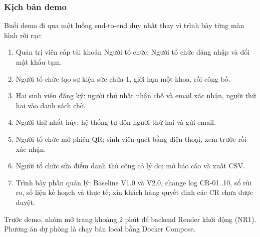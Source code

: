 \subsubsection{Kịch bản demo}

Buổi demo đi qua một luồng end-to-end duy nhất thay vì trình bày từng màn hình rời rạc:
\begin{enumerate}
    \item Quản trị viên cấp tài khoản Người tổ chức; Người tổ chức đăng nhập và đổi mật khẩu tạm.
    \item Người tổ chức tạo sự kiện sức chứa 1, giới hạn một khoa, rồi công bố.
    \item Hai sinh viên đăng ký: người thứ nhất nhận chỗ và email xác nhận, người thứ hai vào danh sách chờ.
    \item Người thứ nhất hủy: hệ thống tự đôn người thứ hai và gửi email.
    \item Người tổ chức mở phiên QR; sinh viên quét bằng điện thoại, xem trước rồi xác nhận.
    \item Người tổ chức sửa điểm danh thủ công có lý do; mở báo cáo và xuất CSV.
    \item Trình bày phần quản lý: Baseline V1.0 và V2.0, change log CR-01..10, sổ rủi ro, số liệu kế hoạch và thực tế; xin khách hàng quyết định các CR chưa được duyệt.
\end{enumerate}
Trước demo, nhóm mở trang khoảng 2 phút để backend Render khởi động (NR1). Phương án dự phòng là chạy bản local bằng Docker Compose.
